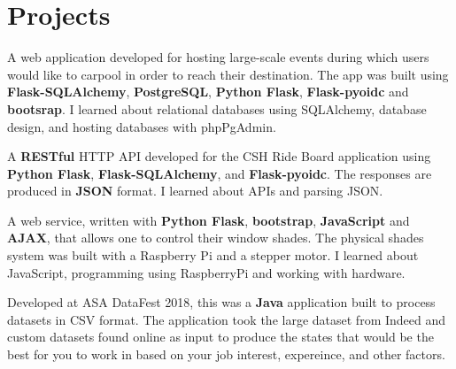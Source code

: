 \documentclass[]{deedy-resume-openfont}
\begin{document}
\begin{minipage}[t]{0.67\textwidth}


\section{Projects}
A web application developed for hosting large-scale events during which users would like to carpool in order to reach their destination.
The app was built using \textbf{Flask-SQLAlchemy}, \textbf{PostgreSQL}, \textbf{Python Flask}, \textbf{Flask-pyoidc} and \textbf{bootsrap}.
I learned about relational databases using SQLAlchemy, database design, and hosting databases with phpPgAdmin.
\sectionsep

A \textbf{RESTful} HTTP API developed for the CSH Ride Board application using \textbf{Python Flask}, \textbf{Flask-SQLAlchemy}, and \textbf{Flask-pyoidc}. The responses are produced in \textbf{JSON} format. I learned about APIs and parsing JSON.
\sectionsep

A web service, written with \textbf{Python Flask}, \textbf{bootstrap}, \textbf{JavaScript} and \textbf{AJAX}, that allows one to control their window shades. The physical shades system was built with a Raspberry Pi and a stepper motor. I learned about JavaScript, programming using RaspberryPi and working with hardware.
\sectionsep

\location{}
Developed at ASA DataFest 2018, this was a \textbf{Java} application built to process datasets in CSV format.
The application took the large dataset from Indeed and custom datasets found online as input to produce the states that would be the best for you to work in based on your job interest, expereince, and other factors.
\sectionsep


\end{minipage}
\end{document}
